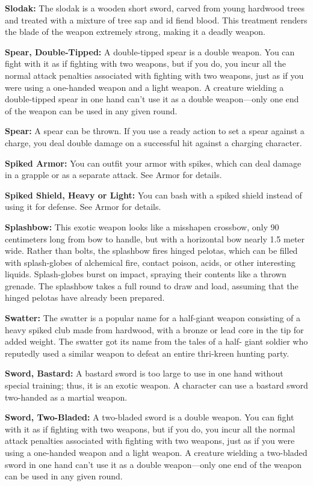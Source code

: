 \textbf{Slodak:} The slodak is a wooden short sword, carved from young hardwood trees and treated with a mixture of tree sap and id fiend blood. This treatment renders the blade of the weapon extremely strong, making it a deadly weapon.

\textbf{Spear, Double-Tipped:} A double-tipped spear is a double weapon. You can fight with it as if fighting with two weapons, but if you do, you incur all the normal attack penalties associated with fighting with two weapons, just as if you were using a one-handed weapon and a light weapon. A creature wielding a double-tipped spear in one hand can't use it as a double weapon---only one end of the weapon can be used in any given round.

\textbf{Spear:} A spear can be thrown. If you use a ready action to set a spear against a charge, you deal double damage on a successful hit against a charging character. 

\textbf{Spiked Armor:} You can outfit your armor with spikes, which can deal damage in a grapple or as a separate attack. See Armor for details. 

\textbf{Spiked Shield, Heavy or Light:} You can bash with a spiked shield instead of using it for defense. See Armor for details. 

\textbf{Splashbow:} This exotic weapon looks like a misshapen crossbow, only 90 centimeters long from bow to handle, but with a horizontal bow nearly 1.5 meter wide. Rather than bolts, the splashbow fires hinged pelotas, which can be filled with splash-globes of alchemical fire, contact poison, acids, or other interesting liquids. Splash-globes burst on impact, spraying their contents like a thrown grenade. The splashbow takes a full round to draw and load, assuming that the hinged pelotas have already been prepared.

\textbf{Swatter:} The swatter is a popular name for a half-giant weapon consisting of a heavy spiked club made from hardwood, with a bronze or lead core in the tip for added weight. The swatter got its name from the tales of a half- giant soldier who reputedly used a similar weapon to defeat an entire thri-kreen hunting party.

\textbf{Sword, Bastard:} A bastard sword is too large to use in one hand without special training; thus, it is an exotic weapon. A character can use a bastard sword two-handed as a martial weapon. 

\textbf{Sword, Two-Bladed:} A two-bladed sword is a double weapon. You can fight with it as if fighting with two weapons, but if you do, you incur all the normal attack penalties associated with fighting with two weapons, just as if you were using a one-handed weapon and a light weapon. A creature wielding a two-bladed sword in one hand can't use it as a double weapon---only one end of the weapon can be used in any given round. 

